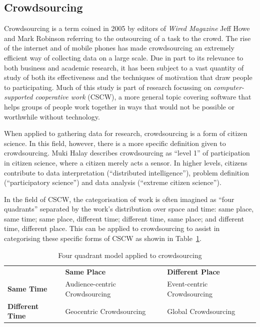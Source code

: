 \documentclass{article}
\begin{document}
		\subsection{Crowdsourcing}
		Crowdsourcing is a term coined in 2005 by editors of \emph{Wired Magazine} Jeff Howe and Mark Robinson\cite{safire_fat_2009} referring to the outsourcing of a task to the crowd. The rise of the internet and of mobile phones has made crowdsourcing an extremely efficient way of collecting data on a large scale. Due in part to its relevance to both business and academic research, it has been subject to a vast quantity of study of both its effectiveness\cite{brabham_effectiveness_2010} and the techniques of motivation that draw people to participating\cite{hossain_users_2012}. Much of this study is part of research focussing on \emph{computer-supported cooperative work} (CSCW), a more general topic covering software that helps groups of people work together in ways that would not be possible or worthwhile without technology.

		When applied to gathering data for research, crowdsourcing is a form of citizen science\cite{_citizen_2015}. In this field, however, there is a more specific definition given to crowdsourcing. Muki Halay describes crowdsourcing as ``level 1'' of participation in citizen science, where a citizen merely acts a sensor. In higher levels, citizens contribute to data interpretation (``distributed intelligence''), problem definition (``participatory science'') and data analysis (``extreme citizen science'')\cite{haklay_citizen_2013}.

		In the field of CSCW, the categorisation of work is often imagined as ``four quadrants''\cite{johansen_groupware:_1988} separated by the work's distribution over space and time: same place, same time; same place, different time; different time, same place; and different time, different place. This can be applied to crowdsourcing to assist in categorising these specific forms of CSCW as showin in Table~\ref{tab:quad}\cite{erickson_geocentric_2010}.

		\begin{table}[ht]
			\begin{tabularx}{\textwidth}{ | l || X | X | }
				\hline
				                        & \textbf{Same Place}            & \textbf{Different Place} \\ \hhline{|=#=|=|}
				\textbf{Same Time}      & Audience-centric Crowdsourcing & Event-centric Crowdsourcing \\ \hline
				\textbf{Different Time} & Geocentric Crowdsourcing       & Global Crowdsourcing \\ \hline
			\end{tabularx}
			\caption{Four quadrant model applied to crowdsourcing\cite{erickson_geocentric_2010}}
			\label{tab:quad}
		\end{table}
\end{document}
